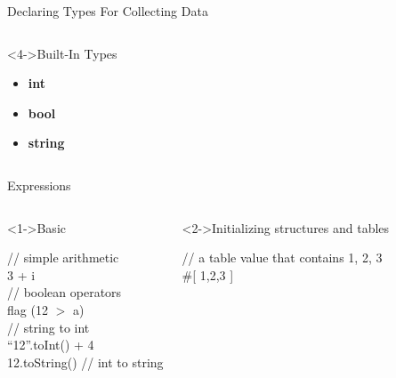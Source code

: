 \documentclass[10pt,xcolor={dvipsnames}]{beamer}
\begin{document}
\begin{frame}{Declaring Types For Collecting Data}
\begin{columns}
\begin{exampleblock}
			\end{exampleblock}
		\end{columns}
		\begin{columns}
			\centering
			\begin{block}<4->{Built-In Types}
				\begin{itemize}
					\item \textbf{int}
					\item \textbf{bool}
					\item \textbf{string}
				\end{itemize}
			\end{block}
		\end{columns}
	\end{frame}
	
	\begin{frame}{Expressions}
		\begin{columns}
			\column{0.4\textwidth}
			\begin{exampleblock}<1->{Basic}
				\begin{footnotesize}
					\hspace{.1cm} \textcolor{Emerald}{// simple arithmetic} \\
					\hspace{.1cm} 3 + i \\
					\hspace{.1cm} \textcolor{Emerald}{// boolean operators} \\
					\hspace{.1cm} flag  (12 $>$ a) \\
					\hspace{.1cm} \textcolor{Emerald}{// string to int} \\
					\hspace{.1cm} \textcolor{NavyBlue}{``12''}.toInt() + 4 \\
					\hspace{.1cm} 12.toString() \textcolor{Emerald}{// int to string}\\
				\end{footnotesize}
			\end{exampleblock}
			\column{0.56\textwidth}
			\begin{exampleblock}<2->{Initializing structures and tables}
				\begin{footnotesize}
					\hspace{.1cm} \textcolor{Emerald}{ // a table value that contains 1, 2, 3} \\
					\hspace{.1cm} \#[ 1,2,3 ] \\

\end{footnotesize}
\end{exampleblock}
\end{columns}
\end{frame}
\end{document}
